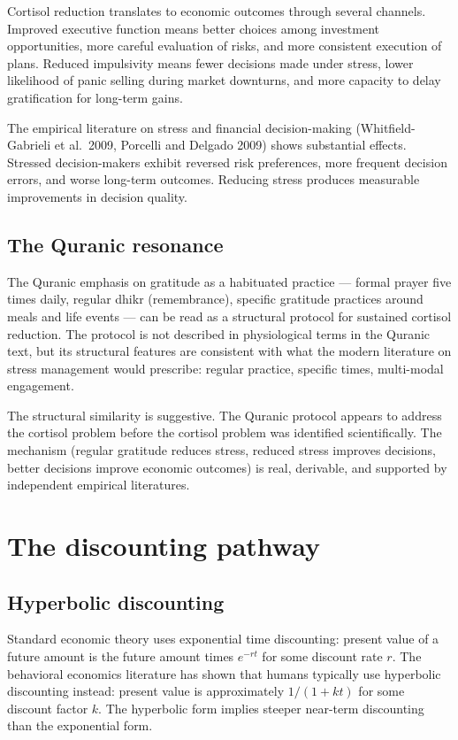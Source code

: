 Cortisol reduction translates to economic outcomes through several
channels. Improved executive function means better choices among
investment opportunities, more careful evaluation of risks, and
more consistent execution of plans. Reduced impulsivity means
fewer decisions made under stress, lower likelihood of panic
selling during market downturns, and more capacity to delay
gratification for long-term gains.

The empirical literature on stress and financial decision-making
(Whitfield-Gabrieli et al.\ 2009, Porcelli and Delgado 2009) shows
substantial effects. Stressed decision-makers exhibit reversed
risk preferences, more frequent decision errors, and worse
long-term outcomes. Reducing stress produces measurable
improvements in decision quality.

\subsection{The Quranic resonance}

The Quranic emphasis on gratitude as a habituated practice ---
formal prayer five times daily, regular dhikr (remembrance),
specific gratitude practices around meals and life events --- can
be read as a structural protocol for sustained cortisol reduction.
The protocol is not described in physiological terms in the
Quranic text, but its structural features are consistent with
what the modern literature on stress management would prescribe:
regular practice, specific times, multi-modal engagement.

The structural similarity is suggestive. The Quranic protocol
appears to address the cortisol problem before the cortisol
problem was identified scientifically. The mechanism (regular
gratitude reduces stress, reduced stress improves decisions,
better decisions improve economic outcomes) is real, derivable,
and supported by independent empirical literatures.

\section{The discounting pathway}
\label{sec:grat-discounting}

\subsection{Hyperbolic discounting}

Standard economic theory uses exponential time discounting:
present value of a future amount is the future amount times
$e^{-rt}$ for some discount rate $r$. The behavioral economics
literature has shown that humans typically use hyperbolic
discounting instead: present value is approximately
$1 / (1 + kt)$ for some discount factor $k$. The hyperbolic form
implies steeper near-term discounting than the exponential form.

